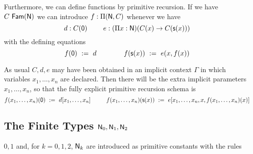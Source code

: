 \documentclass[10pt,a4paper]{article}
\newcommand{\suc}{{\sf s}}
\newcommand{\NN}{{\sf N}}
\newcommand{\zero}{{\sf 0}}
\newcommand{\Fam}{{\sf Fam}}
\begin{document}
 Furthermore, we can define functions by primitive recursion.  If we have
$C~\Fam(\NN)$ we can introduce $f:\Pi(\NN,C)$ whenever we have
$$
d:C(\zero)~~~~~~~e:(\Pi x:\NN)(C(x)\rightarrow C(\suc (x)))
$$
with the defining equations
$$
f(\zero) ~:=~ d~~~~~~~~~~~~f(\suc (x)) ~:=~ e(x,f(x))
$$
 
As usual $C,d,e$ may have been obtained in an implicit context $\Gamma$ in which variables $x_1,\ldots,x_n$ are declared.  Then there will be the extra implicit parameters $x_1,\ldots,x_n$, so that the fully explicit primitive recursion schema is
$$
f(x_1,\dots,x_n)(\zero) ~:=~ d[x_1,\dots,x_n]~~~~~~~~f(x_1,\dots,x_n)(\suc (x)) ~:=~ e[x_1,\dots,x_n,x,f(x_1,\dots,x_n)(x)]
$$

\medskip
\subsection*{The Finite Types $\NN_0,\NN_1,\NN_2$}

$0,1$ and, for $k=0,1,2$, $\NN_k$ are introduced as primitive constants with the rules
\end{document}
